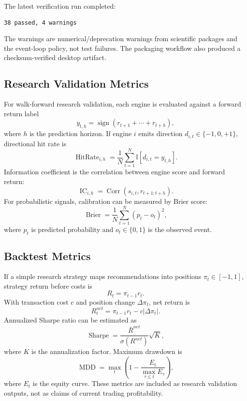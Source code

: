 \documentclass[conference]{IEEEtran}
\begin{document}
The latest verification run completed:

\begin{lstlisting}
38 passed, 4 warnings
\end{lstlisting}

The warnings are numerical/deprecation warnings from scientific packages and
the event-loop policy, not test failures. The packaging workflow also
produced a checksum-verified desktop artifact.

\subsection{Research Validation Metrics}

For walk-forward research validation, each engine is evaluated against a
forward return label
\begin{equation}
y_{t,h}=\operatorname{sign}(r_{t+1}+\cdots+r_{t+h}),
\end{equation}
where $h$ is the prediction horizon. If engine $i$ emits direction
$d_{i,t}\in\{-1,0,+1\}$, directional hit rate is
\begin{equation}
\operatorname{HitRate}_{i,h} =
\frac{1}{N}\sum_{t=1}^{N}\mathbb{I}[d_{i,t}=y_{t,h}].
\end{equation}
Information coefficient is the correlation between engine score and forward
return:
\begin{equation}
\operatorname{IC}_{i,h}=\operatorname{Corr}(s_{i,t}, r_{t+1:t+h}).
\end{equation}
For probabilistic signals, calibration can be measured by Brier score:
\begin{equation}
\operatorname{Brier}=\frac{1}{N}\sum_{t=1}^{N}(p_t-o_t)^2,
\end{equation}
where $p_t$ is predicted probability and $o_t\in\{0,1\}$ is the observed
event.

\subsection{Backtest Metrics}

If a simple research strategy maps recommendations into positions
$\pi_t\in[-1,1]$, strategy return before costs is
\begin{equation}
R_t=\pi_{t-1}r_t.
\end{equation}
With transaction cost $c$ and position change $\Delta \pi_t$, net return is
\begin{equation}
R_t^{net}=\pi_{t-1}r_t-c|\Delta\pi_t|.
\end{equation}
Annualized Sharpe ratio can be estimated as
\begin{equation}
\operatorname{Sharpe}=\frac{\bar{R}^{net}}{\sigma(R^{net})}\sqrt{K},
\end{equation}
where $K$ is the annualization factor. Maximum drawdown is
\begin{equation}
\operatorname{MDD}=\max_t
\left(1-\frac{E_t}{\max_{\tau\leq t}E_{\tau}}\right),
\end{equation}
where $E_t$ is the equity curve. These metrics are included as research
validation outputs, not as claims of current trading profitability.
\end{document}
